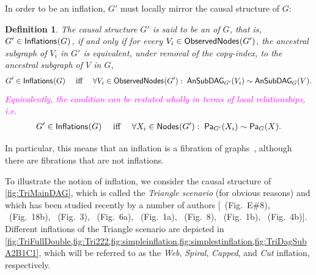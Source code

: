 \documentclass[aps,english,10pt,superscriptaddress,onecolumn,twoside,longbibliography,pra,floatfix,fleqn,nofootinbib]{revtex4-1}
\newcommand*{\tblue}[1]{{\color{medblue}{\textbf{#1}}}}
\newtheorem{definition}[theorem]{Definition}
\theoremstyle{definition}
\newcommand{\Pa}[2][]{{\mathsf{Pa}_{#1}}\parenths{#2}}
\newcommand{\SmallNamedFunction}[3][]{\operatorname{\mathsf{#2}}_{#1}\parenths{#3}}
\newcommand{\ansubgraph}[2][]{\SmallNamedFunction[#1]{AnSubDAG}{#2}}
\newcommand{\nodes}[1]{\SmallNamedFunction{Nodes}{#1}}
\newcommand{\obsnodes}[1]{\SmallNamedFunction{ObservedNodes}{#1}}
\newcommand{\inflations}[1]{\SmallNamedFunction{Inflations}{#1}}
\DeclarePairedDelimiter{\parenths}{\lparen}{\rparen}
\newcommand{\elie}[1]{\textcolor{Fuchsia}{#1}}
\begin{document}
In order to be an inflation, $G'$ must locally mirror the causal structure of $G$:
\begin{definition}
	The causal structure $G'$ is said to be an \tblue{inflation} of $G$, that is, $G' \in \inflations{G}$, if and only if for every $V_i\in\obsnodes{G'}$, the ancestral subgraph of $V_i$ in $G'$ is equivalent, under removal of the copy-index, to the ancestral subgraph of $V$ in $G$,
\begin{align}\label{eq:definflationDAG}
G' \in\inflations{G} \quad\text{ iff }\quad \forall V_i\in \obsnodes{G'}:\; \ansubgraph[G']{V_i}\sim\ansubgraph[G]{V}.
\end{align}
\elie{Equivalently, the condition can be restated wholly in terms of local relationships, i.e.
\begin{align}\label{eq:definflationDAGalt}
G' \in\inflations{G} \quad\text{ iff }\quad \forall X_i\in \nodes{G'}:\; \Pa[G']{X_i}\sim\Pa[G]{X}.
\end{align}}
\end{definition}

In particular, this means that an inflation is a fibration of graphs~\cite{fibgraphs}, although there are fibrations that are not inflations.

To illustrate the notion of inflation, we consider the causal structure of \cref{fig:TriMainDAG}, which is called the {\em Triangle scenario} (for obvious reasons) and which has been studied recently by a number of authors [\citealp{pusey2014gdag}~(Fig.~E\#8), \citealp{WoodSpekkens}~(Fig.~18b), \citealp{fritz2012bell}~(Fig.~3), \citealp{chaves2014novel}~(Fig.~6a), \citealp{Chaves2015infoquantum}~(Fig.~1a), \citealp{BilocalCorrelations}~(Fig.~8), \citealp{steudel2010ancestors}~(Fig.~1b), \citealp{chaves2014informationinference}~(Fig.~4b)].
Different inflations of the Triangle scenario are depicted in \cref{fig:TriFullDouble,fig:Tri222,fig:simpleinflation,fig:simplestinflation,fig:TriDagSubA2B1C1}, which will be referred to as the {\em Web}, {\em Spiral}, {\em Capped}, and {\em Cut} inflation, respectively.
\end{document}
